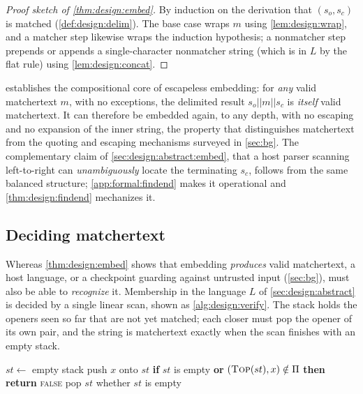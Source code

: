 \begin{proof}[Proof sketch of \cref{thm:design:embed}]
By induction on the derivation that $(s_o,s_c)$ is matched
(\cref{def:design:delim}).
The base case wraps $m$ using \cref{lem:design:wrap},
and a matcher step likewise wraps the induction hypothesis;
a nonmatcher step prepends or appends a single-character
nonmatcher string (which is in $L$ by the flat rule)
using \cref{lem:design:concat}.
\end{proof}

 establishes the compositional core
of escapeless embedding:
for \emph{any} valid matchertext $m$, with no exceptions,
the delimited result $s_o||m||s_c$ is \emph{itself} valid matchertext.
It can therefore be embedded again, to any depth,
with no escaping and no expansion of the inner string,
the property that distinguishes matchertext
from the quoting and escaping mechanisms surveyed in \cref{sec:bg}.
The complementary claim of \cref{sec:design:abstract:embed},
that a host parser scanning left-to-right can \emph{unambiguously}
locate the terminating $s_c$,
follows from the same balanced structure;
\cref{app:formal:findend} makes it operational
and \cref{thm:design:findend} mechanizes it.

\subsection{Deciding matchertext}
\label{app:formal:verify}

Whereas \cref{thm:design:embed} shows that embedding \emph{produces}
valid matchertext,
a host language, or a checkpoint guarding against untrusted input
(\cref{sec:bg}),
must also be able to \emph{recognize} it.
Membership in the language $L$ of \cref{sec:design:abstract}
is decided by a single linear scan,
shown as \cref{alg:design:verify}.
The stack holds the openers seen so far that are not yet matched;
each closer must pop the opener of its own pair,
and the string is matchertext exactly when
the scan finishes with an empty stack.

\begin{algorithm}[!t]
\caption{Deciding whether a string $s$ is matchertext.}
\label{alg:design:verify}
\begin{algorithmic}[1]
	\State $st \gets$ empty stack 
		 push $x$ onto $st$
			\State \textbf{if} $st$ is empty \textbf{or} $(\textsc{Top}(st), x) \notin \Pi$
				\textbf{then return} \textsc{false}
			\State pop $st$
		\EndIf
	\EndFor
	\State \Return whether $st$ is empty
\EndFunction
\end{algorithmic}
\end{algorithm}

